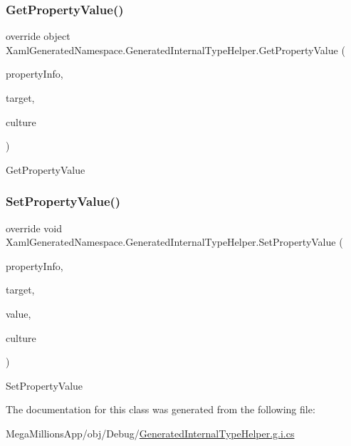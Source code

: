 \subsubsection{\texorpdfstring{Get\+Property\+Value()}{GetPropertyValue()}}
{\footnotesize\ttfamily override object Xaml\+Generated\+Namespace.\+Generated\+Internal\+Type\+Helper.\+Get\+Property\+Value (\begin{DoxyParamCaption}\item[{System.\+Reflection.\+Property\+Info}]{property\+Info,  }\item[{object}]{target,  }\item[{System.\+Globalization.\+Culture\+Info}]{culture }\end{DoxyParamCaption})\hspace{0.3cm}{\ttfamily [protected]}}



Get\+Property\+Value 

\mbox{\label{class_xaml_generated_namespace_1_1_generated_internal_type_helper_ade0f04c0f7b18dd5b170e071d5534d38}} 
\subsubsection{\texorpdfstring{Set\+Property\+Value()}{SetPropertyValue()}}
{\footnotesize\ttfamily override void Xaml\+Generated\+Namespace.\+Generated\+Internal\+Type\+Helper.\+Set\+Property\+Value (\begin{DoxyParamCaption}\item[{System.\+Reflection.\+Property\+Info}]{property\+Info,  }\item[{object}]{target,  }\item[{object}]{value,  }\item[{System.\+Globalization.\+Culture\+Info}]{culture }\end{DoxyParamCaption})\hspace{0.3cm}{\ttfamily [protected]}}



Set\+Property\+Value 



The documentation for this class was generated from the following file\+:\begin{DoxyCompactItemize}
\item 
Mega\+Millions\+App/obj/\+Debug/\hyperlink{_generated_internal_type_helper_8g_8i_8cs}{Generated\+Internal\+Type\+Helper.\+g.\+i.\+cs}\end{DoxyCompactItemize}
